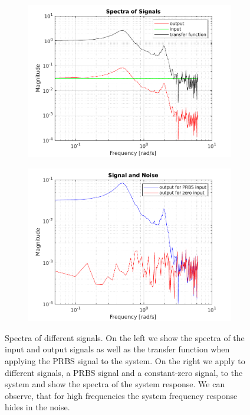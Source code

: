 \documentclass{scrartcl}
\begin{document}
\begin{figure}[h!]
	\centering
	\begin{subfigure}{0.49\textwidth}
		\includegraphics[width=\textwidth]{figures/ffts.pdf}
		\label{fig:ffts_diff}
	\end{subfigure}
	\begin{subfigure}{0.49\textwidth}
		\includegraphics[width=\textwidth]{figures/ffts_snr.pdf}
		\label{fig:ffts_snr}
	\end{subfigure}
	\caption{Spectra of different signals. On the left we show the spectra of the input and output signals as well as the transfer function when applying the PRBS signal to the system. On the right we apply to different signals, a PRBS signal and a constant-zero signal, to the system and show the spectra of the system response. We can observe, that for high frequencies the system frequency response hides in the noise.}
\end{figure}
\end{document}
